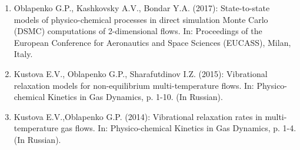 \documentclass{resume} %
\begin{document}
\begin{enumerate}
    \item {{Oblapenko G.P.}, Kashkovsky A.V., Bondar Y.A.} (2017): State-to-state models of physico-chemical processes in direct simulation Monte Carlo (DSMC) computations of 2-dimensional flows. In: Proceedings of the European Conference for Aeronautics and Space Sciences (EUCASS), Milan, Italy.

    \item  {Kustova E.V., {Oblapenko G.P.}, Sharafutdinov I.Z.} (2015):  {Vibrational relaxation models for non-equilibrium multi-temperature flows}. In: Physico-chemical Kinetics in Gas Dynamics, p. 1-10. (In Russian).

    \item  {Kustova E.V.,{Oblapenko G.P.}} (2014): {Vibrational relaxation rates in multi-temperature gas flows.} In: Physico-chemical Kinetics in Gas Dynamics, p. 1-4. (In Russian).
\end{enumerate}
\end{document}
